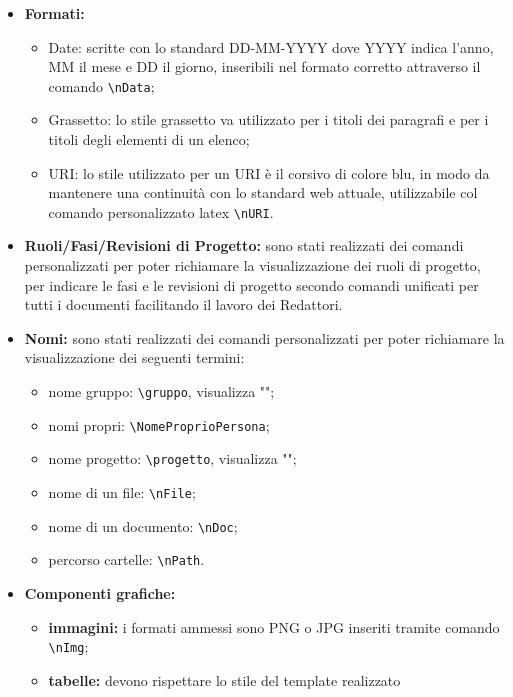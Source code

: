 \documentclass[NormeDiProgetto.tex]{subfiles}
\begin{document}
\begin{itemize}
			\item \textbf{Formati:}
			\begin{itemize}
				\item Date: scritte con lo standard DD-MM-YYYY dove YYYY indica l'anno, MM il mese e DD il giorno, inseribili nel formato corretto attraverso il comando \texttt{\textbackslash nData};
				\item Grassetto: lo stile grassetto va utilizzato per i titoli dei paragrafi e per i titoli degli elementi di un elenco; 
				\item URI: lo stile utilizzato per un URI è il corsivo di colore blu, in modo da mantenere una continuità con lo standard web attuale, utilizzabile col comando personalizzato latex \texttt{\textbackslash nURI}.
			\end{itemize}
			
			\item \textbf{Ruoli/Fasi/Revisioni di Progetto:} sono stati realizzati dei comandi personalizzati per poter richiamare la visualizzazione dei ruoli di progetto, per indicare le fasi e le revisioni di progetto secondo comandi unificati per tutti i documenti facilitando il lavoro dei Redattori.
			
			\item \textbf{Nomi:} sono stati realizzati dei comandi personalizzati per poter richiamare la visualizzazione dei seguenti termini:
			\begin{itemize}
				\item nome gruppo: \texttt{\textbackslash gruppo}, visualizza "\gruppo";
				\item nomi propri: \texttt{\textbackslash NomeProprioPersona};
				\item nome progetto: \texttt{\textbackslash progetto}, visualizza "\progetto";
				\item nome di un file: \texttt{\textbackslash nFile};
				\item nome di un documento: \texttt{\textbackslash nDoc};
				\item percorso cartelle: \texttt{\textbackslash nPath}.
			\end{itemize}
		
			\item \textbf{Componenti grafiche:}
			 \begin{itemize}
			 	\item \textbf{immagini:} i formati ammessi sono PNG o JPG inseriti tramite comando \texttt{\textbackslash nImg}; 
			 	\item \textbf{tabelle:} devono rispettare lo stile del template realizzato
			 \end{itemize}
			
		\end{itemize}
	
\end{document}
